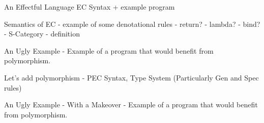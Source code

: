 \documentclass{beamer}
\newcommand\script[1]{}
\begin{document}
\begin{frame}{An Effectful Language}
    EC Syntax + example program    

    \script{
        - Let's now describe a simple effectful, lambda-calculus-based, language, EC.
        - It has an explicit graded monad, subtyping, if-statements

        - Here's a simple program written in EC.
    }
\end{frame}

\begin{frame}{Semantics of EC}
    - example of some denotational rules
        - return?
        - lambda?
        - bind?
    - S-Category - definition

    \script{
        - As described, all of the language features can be modelled in a cartesian closed category with a graded monad, a coproduct, and subtyping morphisms.

        - Known as an S-Category

        - Here's an example, if we have the denotation of an expression here, we can get the denotation of using it as a pure computation by postcomposing with the unit of the graded monad.

    }
\end{frame}

\begin{frame}{An Ugly Example}
    - Example of a program that would benefit from polymorphism.    

    \script{
        - Here's a program that's quite ugly with lots of code reuse, since we explicitly state types in the expressions. 
        - we end up with two instantiations of the same function - more work for the compiler
    }
\end{frame}

\begin{frame}{Let's add polymorphism}
    - PEC Syntax, Type System (Particularly Gen and Spec rules)
    \script{
        - Let's now add some polymorphism syntax to EC.
        - This gives us the polymorphic effect calculus.
        - Notice now that in our type rules, we now have an effect-variable environment. Important later
    }
\end{frame}

\begin{frame}{An Ugly Example - With a Makeover}
    - Example of a program that would benefit from polymorphism.
    \script{
        - We've now added polymorphism, which makes our ugly program more concise.
        - We can reuse this function
    }
\end{frame}
\end{document}
